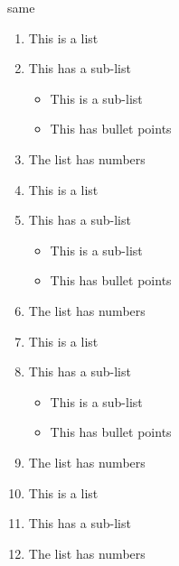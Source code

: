 \begin{frame}{same}
    \begin{enumerate}
            \item This is a list
            \item This has a sub-list
                \begin{itemize}
                    \item This is a sub-list
                    \item This has bullet points
                \end{itemize}
            \item The list has numbers
            \item This is a list
            \item This has a sub-list
                \begin{itemize}
                    \item This is a sub-list
                    \item This has bullet points
                \end{itemize}
            \item The list has numbers   
            \item This is a list
            \item This has a sub-list
                \begin{itemize}
                    \item This is a sub-list
                    \item This has bullet points
                \end{itemize}
            \item The list has numbers   
            \item This is a list
            \item This has a sub-list
          
            \item The list has numbers   
        \end{enumerate}
\end{frame}